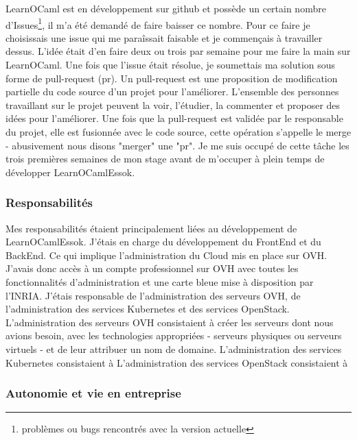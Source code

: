 \documentclass{article}
\begin{document}
LearnOCaml est en développement sur github et possède un certain nombre d'Issues\footnote{\label{Issues} problèmes ou bugs rencontrés avec la version actuelle}, il m'a été demandé de faire baisser ce nombre.
\newline
Pour ce faire je choisissais une issue qui me paraîssait faisable et je commençais à travailler dessus. L'idée était d'en faire deux ou trois par semaine pour me faire la main sur LearnOCaml.
\newline
Une fois que l'issue était résolue, je soumettais ma solution sous forme de pull-request (pr). Un pull-request est une proposition de modification partielle du code source d'un projet pour l'améliorer. L'ensemble des personnes travaillant sur le projet peuvent la voir, l'étudier, la commenter et proposer des idées pour l'améliorer. Une fois que la pull-request est validée par le responsable du projet, elle est fusionnée avec le code source, cette opération s'appelle le merge - abusivement nous disons "merger" une "pr".
\newline
Je me suis occupé de cette tâche les trois premières semaines de mon stage avant de m'occuper à plein temps de développer LearnOCamlEssok.

\subsubsection{Responsabilités}

Mes responsabilités étaient principalement liées au développement de LearnOCamlEssok. J'étais en charge du développement du FrontEnd et du BackEnd. Ce qui implique l'administration du Cloud mis en place sur OVH.
\newline
J'avais donc accès à un compte professionnel sur OVH avec toutes les fonctionnalités d'administration et une carte bleue mise à disposition par l'INRIA. J'étais responsable de l'administration des serveurs OVH, de l'administration des services Kubernetes et des services OpenStack.
\newline
L'administration des serveurs OVH consistaient à créer les serveurs dont nous avions besoin, avec les technologies appropriées - serveurs physiques ou serveurs virtuels - et de leur attribuer un nom de domaine.
\newline
L'administration des services Kubernetes consistaient à 
\newline
L'administration des services OpenStack consistaient à 

\subsubsection{Autonomie et vie en entreprise}
\end{document}
